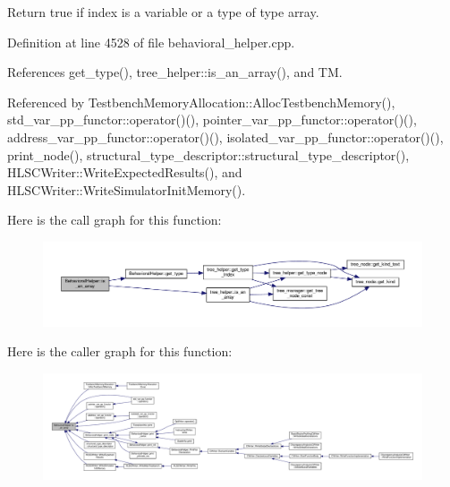 Return true if index is a variable or a type of type array. 



Definition at line 4528 of file behavioral\+\_\+helper.\+cpp.



References get\+\_\+type(), tree\+\_\+helper\+::is\+\_\+an\+\_\+array(), and TM.



Referenced by Testbench\+Memory\+Allocation\+::\+Alloc\+Testbench\+Memory(), std\+\_\+var\+\_\+pp\+\_\+functor\+::operator()(), pointer\+\_\+var\+\_\+pp\+\_\+functor\+::operator()(), address\+\_\+var\+\_\+pp\+\_\+functor\+::operator()(), isolated\+\_\+var\+\_\+pp\+\_\+functor\+::operator()(), print\+\_\+node(), structural\+\_\+type\+\_\+descriptor\+::structural\+\_\+type\+\_\+descriptor(), H\+L\+S\+C\+Writer\+::\+Write\+Expected\+Results(), and H\+L\+S\+C\+Writer\+::\+Write\+Simulator\+Init\+Memory().

Here is the call graph for this function\+:
\nopagebreak
\begin{figure}[H]
\begin{center}
\leavevmode
\includegraphics[width=350pt]{dd/db2/classBehavioralHelper_ac060a3b1575371be4bc553b158cdd5da_cgraph}
\end{center}
\end{figure}
Here is the caller graph for this function\+:
\nopagebreak
\begin{figure}[H]
\begin{center}
\leavevmode
\includegraphics[width=350pt]{dd/db2/classBehavioralHelper_ac060a3b1575371be4bc553b158cdd5da_icgraph}
\end{center}
\end{figure}
\mbox{\label{classBehavioralHelper_af5d46a8fdf37f33a68436389fafc34b9}} 
